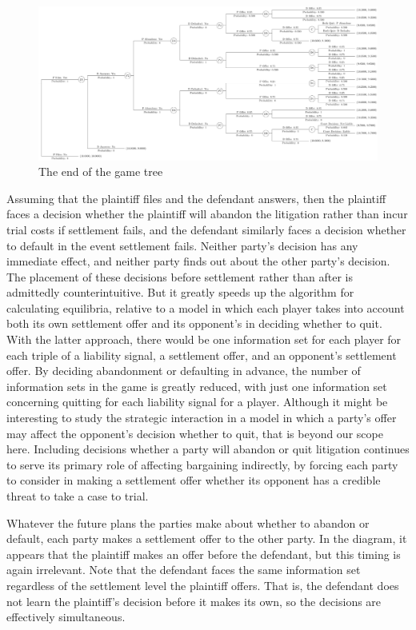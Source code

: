 \documentclass{article}
\begin{document}
\begin{figure}[h!]
\centering
\includegraphics[scale=0.25, trim={0in 0in 0in 0in}, clip]{../Figures/game tree 2x2x2 end.pdf}
\caption{The end of the game tree}
\label{fig:gametree2x2x2end}
\end{figure}

Assuming that the plaintiff files and the defendant answers, then the plaintiff faces a decision whether the plaintiff will abandon the litigation rather than incur trial costs if settlement fails, and the defendant similarly faces a decision whether to default in the event settlement fails. Neither party's decision has any immediate effect, and neither party finds out about the other party's decision. The placement of these decisions before settlement rather than after is admittedly counterintuitive. But it greatly speeds up the algorithm for calculating equilibria, relative to a model in which each player takes into account both its own settlement offer and its opponent's in deciding whether to quit. With the latter approach, there would be one information set for each player for each triple of a liability signal, a settlement offer, and an opponent's settlement offer. By deciding abandonment or defaulting in advance, the number of information sets in the game is greatly reduced, with just one information set concerning quitting for each liability signal for a player. Although it might be interesting to study the strategic interaction in a model in which a party's offer may affect the opponent's decision whether to quit, that is beyond our scope here. Including decisions whether a party will abandon or quit litigation continues to serve its primary role of affecting bargaining indirectly, by forcing each party to consider in making a settlement offer whether its opponent has a credible threat to take a case to trial. 

Whatever the future plans the parties make about whether to abandon or default, each party makes a settlement offer to the other party. In the diagram, it appears that the plaintiff makes an offer before the defendant, but this timing is again irrelevant. Note that the defendant faces the same information set regardless of the settlement level the plaintiff offers. That is, the defendant does not learn the plaintiff's decision before it makes its own, so the decisions are effectively simultaneous. 
\end{document}
